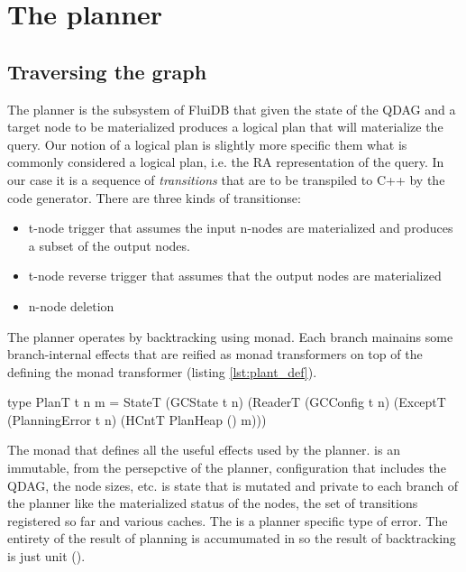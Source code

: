 \section{The planner}
\label{sec:planner}

\subsection{Traversing the graph}

The planner is the subsystem of FluiDB that given the state of the
QDAG and a target node to be materialized produces a logical plan that
will materialize the query.  Our notion of a logical plan is slightly
more specific them what is commonly considered a logical plan,
i.e. the RA representation of the query. In our case it is a sequence
of \emph{transitions} that are to be transpiled to C++ by the code
generator. There are three kinds of transitionse:

\begin{itemize}
\item t-node trigger that assumes the input n-nodes are materialized and
produces a subset of the output nodes.
\item t-node reverse trigger that assumes that the output nodes are materialized
\item n-node deletion
\end{itemize}

The planner operates by backtracking using  monad. Each branch
mainains some branch-internal effects that are reified as monad
transformers on top of the  defining the  monad
transformer (listing \ref{lst:plant_def}).

\begin{code}
\begin{haskellcode}
type PlanT t n m =
  StateT
    (GCState t n)
    (ReaderT (GCConfig t n)
     (ExceptT (PlanningError t n)
      (HCntT PlanHeap () m)))
\end{haskellcode}
  \caption{\label{lst:plant_def}The monad that defines all the useful
    effects used by the planner.  is an immutable,
    from the persepctive of the planner, configuration that includes
    the QDAG, the node sizes, etc.  is state that is
    mutated and private to each branch of the planner like the
    materialized status of the nodes, the set of transitions
    registered so far and various caches. The 
    is a planner specific type of error. The entirety of the result of
    planning is accumumated in  so the result of
    backtracking is just unit (\hask{()}).}
\end{code}

